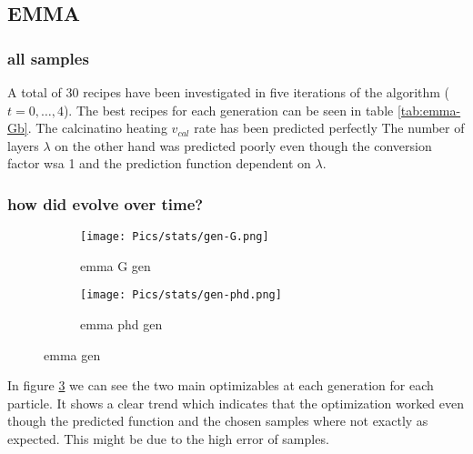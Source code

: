 \subsection{EMMA}

\subsubsection{all samples}
%
A total of 30 recipes have been investigated in 
five iterations of the algorithm ($t = 0, \dots,4$). 
The best recipes for each generation can be seen in table \ref{tab:emma-Gb}. 
The calcinatino heating $v_{cal}$ rate has been predicted perfectly 
The number of layers $\lambda$ on the other hand was predicted poorly 
even though the conversion factor wsa 1 and the prediction function dependent on $\lambda$. 

\subsubsection{how did evolve over time?}

\begin{figure}
    \centering
    \begin{subfigure}{.45\textwidth}
        \texttt{[image: Pics/stats/gen-G.png]}
        \caption{emma G gen } \label{fig:emma-G-gen}
    \end{subfigure}
    \begin{subfigure}{.45\textwidth}
        \texttt{[image: Pics/stats/gen-phd.png]}
        \caption{emma phd gen} \label{fig:emma-phd-gen}
    \end{subfigure}
    \caption{emma gen} \label{fig:emma-gen}
\end{figure}

In figure \ref{fig:emma-gen} we can see the two main optimizables at each generation
for each particle.
It shows a clear trend which indicates that the optimization worked even though 
the predicted function and the chosen samples where not exactly as expected. 
This might be due to the high error of samples. 


